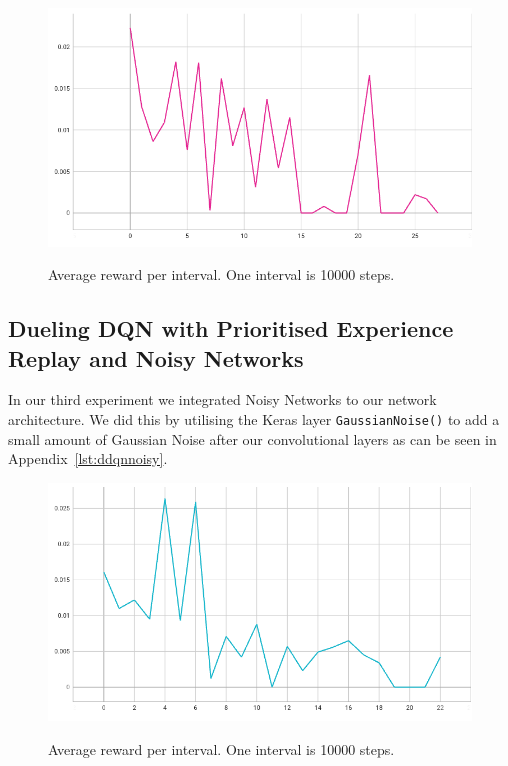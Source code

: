 \documentclass[12pt,a4paper]{article}
\begin{document}
    \begin{figure}[H]
        \caption[DDQN/PER: Average reward per interval.]{Average reward per interval. One interval is 10000 steps.}
        \centering
        \includegraphics[scale=0.5]{interval_score_ddqn_per}
        \label{fig:ddqn_per_interval_score}
    \end{figure}



    \subsection{Dueling DQN with Prioritised Experience Replay and Noisy Networks}\label{subsec:dueling-dqn-with-prioritised-experience-replay-and-noisy-networks} %
    In our third experiment we integrated Noisy Networks to our network architecture.
    We did this by utilising the Keras layer \texttt{GaussianNoise()} to add a small amount of Gaussian Noise after our convolutional layers as can be seen in Appendix~\ref{lst:ddqnnoisy}.
    \begin{figure}[H]
        \caption[DDQN/PER/NN: Average reward per interval.]{Average reward per interval. One interval is 10000 steps.}
        \centering
        \includegraphics[scale=0.5]{interval_score_ddqn_noisy}
        \label{fig:ddqn_noisy_interval_score}
    \end{figure}
\end{document}
